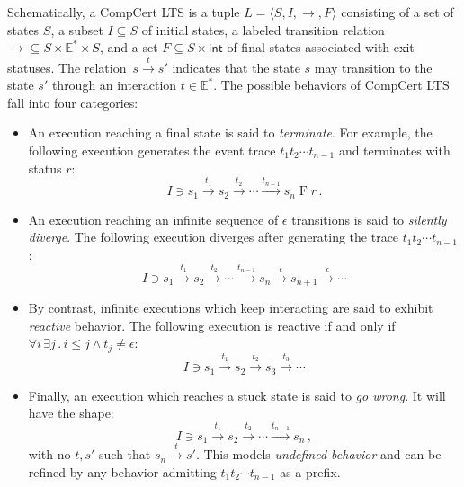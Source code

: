 \documentclass[sigplan,10pt,review,anonymous]{acmart}\settopmatter{printfolios=true,printccs=false,printacmref=false}
\newcommand{\kw}[1]{\ensuremath{ \mathsf{#1} }}
\begin{document}
Schematically, a CompCert LTS
is a tuple
$L = \langle S, I, {\rightarrow}, F \rangle$
consisting of
a set of states $S$,
a subset $I \subseteq S$ of initial states,
a labeled transition relation
${\rightarrow} \subseteq S \times \mathbb{E}^* \times S$,
and a set
$F \subseteq S \times \kw{int}$
of final states associated with exit statuses.
The relation~$s \stackrel{t}{\rightarrow} s'$
indicates that the state $s$ may transition to the state $s'$
through an interaction $t \in \mathbb{E}^*$.
The possible behaviors of CompCert LTS fall into four categories:
\begin{itemize}
\item An execution reaching a final state is said to
    \emph{terminate}.
    For example,
    the following execution generates
    the event trace $t_1 t_2 \cdots t_{n-1}$
    and terminates with status $r$:
    \[
        I \ni s_1 \stackrel{t_1}{\rightarrow}
          s_2 \stackrel{t_2}{\rightarrow}
          \cdots \stackrel{t_{n-1}}{\rightarrow}
          s_n \mathrel{F} r \,.
    \]
\item An execution reaching
    an infinite sequence of $\epsilon$ transitions
    is said to \emph{silently diverge}.
    The following execution diverges after
    generating the trace $t_1 t_2 \cdots t_{n-1}$:
    \[
        I \ni s_1 \stackrel{t_1}{\rightarrow}
          s_2 \stackrel{t_2}{\rightarrow}
          \cdots \stackrel{t_{n-1}}{\rightarrow}
          s_n \stackrel{\epsilon}{\rightarrow}
          s_{n+1} \stackrel{\epsilon}{\rightarrow}
          \cdots
    \]
\item By contrast,
    infinite executions which keep interacting
    are said to exhibit \emph{reactive} behavior.
    The following execution
    is reactive if and only if
    $\forall i \, \exists j \,.\, i \le j \wedge t_j \ne \epsilon$:
    \[
        I \ni s_1 \stackrel{t_1}{\rightarrow}
          s_2 \stackrel{t_2}{\rightarrow}
          s_3 \stackrel{t_3}{\rightarrow}
          \cdots
    \]
\item Finally, an execution which reaches a stuck state
    is said to \emph{go wrong}. It will have the shape:
    \[
        I \ni s_1 \stackrel{t_1}{\rightarrow}
          s_2 \stackrel{t_2}{\rightarrow}
          \cdots \stackrel{t_{n-1}}{\rightarrow}
          s_n \,,
    \]
    with no $t, s'$ such that
    $s_n \stackrel{t}{\rightarrow} s'$.
    This models \emph{undefined behavior}
    and can be refined by any behavior
    admitting $t_1 t_2 \cdots t_{n-1}$ as a prefix.
\end{itemize}
\end{document}
